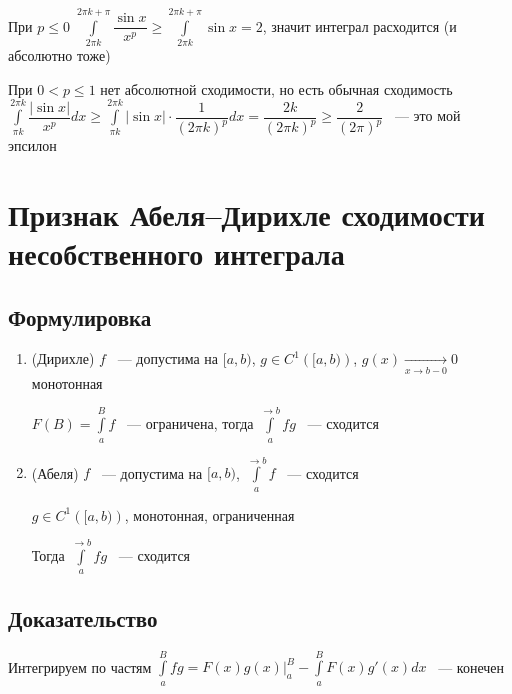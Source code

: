 \documentclass{article}
\begin{document}
        При $p \leq 0$ $\int\limits^{2 \pi k + \pi}_{2 \pi k} \dfrac{\sin{x}}{x^p} \geq \int\limits^{2 \pi k + \pi}_{2 \pi k} \sin{x} = 2$, значит интеграл расходится (и абсолютно тоже)
        
        При $0 < p \leq 1$ нет абсолютной сходимости, но есть обычная сходимость $\int\limits^{2 \pi k}_{\pi k} \dfrac{| \sin{x}|}{x^p} dx \geq \int\limits^{2 \pi k}_{\pi k} |\sin {x}| \cdot \dfrac{1}{(2 \pi k)^p} dx = \dfrac{2k}{(2 \pi k)^p} \geq \dfrac{2}{(2 \pi)^p}$ ~--- это мой эпсилон
        
        
    \newpage
    
    \section{Признак Абеля--Дирихле сходимости несобственного интеграла}
    
        \subsection{Формулировка}
        
            \begin{enumerate}
            
                \item (Дирихле) $f$ ~--- допустима на $[a, b)$, $g \in C^1 \left( [a, b) \right)$, $g(x) \xrightarrow[x \rightarrow b - 0]{} 0$ монотонная
                
                    $F(B) = \int\limits^B_a f$ ~--- ограничена, тогда $\int\limits^{\rightarrow b}_a fg$ ~--- сходится
                    
                \item (Абеля) $f$ ~--- допустима на $[a, b)$, $\int\limits^{\rightarrow b}_a f$ ~--- сходится
                
                    $g \in C^1 \left([a, b) \right)$, монотонная, ограниченная
                    
                    Тогда $\int\limits^{\rightarrow b}_a fg$ ~--- сходится
                
            \end{enumerate}
            
        \subsection{Доказательство}
        
            Интегрируем по частям $\int\limits^B_a fg = F(x) g(x) \bigg|^B_a - \int\limits^B_a F(x) g'(x) dx$ ~--- конечен
            
\end{document}
